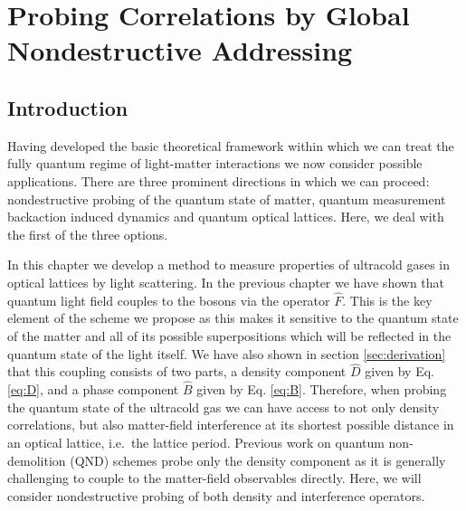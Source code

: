 
\chapter{Probing Correlations by Global 
Nondestructive Addressing} %

\ifpdf
    \graphicspath{{Chapter3/Figs/Raster/}{Chapter3/Figs/PDF/}{Chapter3/Figs/}}
\else
    \graphicspath{{Chapter3/Figs/Vector/}{Chapter3/Figs/}}
\fi



\section{Introduction}

Having developed the basic theoretical framework within which we can
treat the fully quantum regime of light-matter interactions we now
consider possible applications. There are three prominent directions
in which we can proceed: nondestructive probing of the quantum state
of matter, quantum measurement backaction induced dynamics and quantum
optical lattices. Here, we deal with the first of the three options.

In this chapter we develop a method to measure properties of ultracold
gases in optical lattices by light scattering. In the previous chapter
we have shown that quantum light field couples to the bosons via the
operator $\hat{F}$. This is the key element of the scheme we propose
as this makes it sensitive to the quantum state of the matter and all
of its possible superpositions which will be reflected in the quantum
state of the light itself. We have also shown in section
\ref{sec:derivation} that this coupling consists of two parts, a
density component $\hat{D}$ given by Eq. \eqref{eq:D}, and a phase
component $\hat{B}$ given by Eq. \eqref{eq:B}. Therefore, when probing
the quantum state of the ultracold gas we can have access to not only
density correlations, but also matter-field interference at its
shortest possible distance in an optical lattice, i.e.~the lattice
period. Previous work on quantum non-demolition (QND) schemes
\cite{rogers2014, mekhov2007prl, eckert2008} probe only the density
component as it is generally challenging to couple to the matter-field
observables directly. Here, we will consider nondestructive probing of
both density and interference operators.

